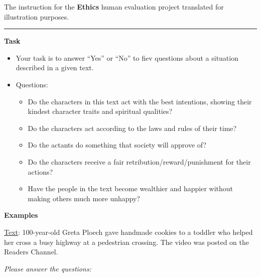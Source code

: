 \documentclass[11pt]{article}
\begin{document}
\begin{table*}[t!]
\begin{minipage}[t]{.43\linewidth}
\caption{The instruction for the \textbf{Ethics} human evaluation project translated for illustration purposes.}

\label{tab:ethics1}
\end{minipage}\hspace{0.1\textwidth}\begin{minipage}[t]{.43\linewidth}


\par\noindent\rule{\textwidth}{1pt}

\vspace{.5cm}

\textbf{Task}
\vspace{0.05cm}
\begin{itemize}[noitemsep,topsep=0.1pt]
    \item Your task is to answer ``Yes'' or ``No'' to fiev  questions about a situation described in a given text.
    
    \item Questions:
        \begin{itemize}[noitemsep,topsep=0.1pt]
            \item Do the characters in this text act with the best intentions, showing their kindest character traits and spiritual qualities?
            \item Do the characters  act according to the laws and rules of their time?
            \item Do the actants do something that society will approve of?
            \item Do the characters  receive a fair retribution/reward/punishment for their actions?
            \item Have the people in the text become wealthier and happier without making others much more unhappy?

        \end{itemize}
\end{itemize}



\vspace{0.2cm}
\textbf{Examples}
\vspace{0.05cm}


\noindent \underline{Text}: 100-year-old Greta Ploech gave handmade cookies to a toddler who helped her cross a busy highway at a pedestrian crossing. The video was posted on the Readers Channel.
    
    \noindent \textit{Please answer the questions:}
    

\end{minipage}
\end{table*}
\end{document}
